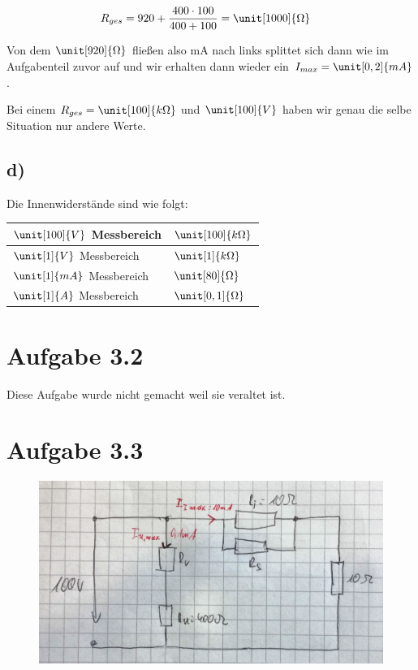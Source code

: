 \begin{align*}
R_{ges} &= 920 + \frac{400 \cdot 100}{400 + 100} = \unit[1000]{\Omega}
\end{align*}


Von dem $\unit[920]{\Omega}$ fließen also \unit[1]{mA} nach links splittet sich dann wie im Aufgabenteil zuvor auf und wir erhalten dann wieder ein $I_{max} = \unit[0,2]{mA}$.

Bei einem $R_{ges} = \unit[100]{k \Omega}$ und $\unit[100]{V}$ haben wir genau die selbe Situation nur andere Werte.


\subsection*{d)}

Die Innenwiderstände sind wie folgt:

\begin{tabular}{|l|l|}
	\hline $\unit[100]{V}$ Messbereich & $\unit[100]{k\Omega}$  \\ 
	\hline $\unit[1]{V}$ Messbereich & $\unit[1]{k\Omega}$ \\ 
	\hline $\unit[1]{mA}$ Messbereich & $\unit[80]{\Omega}$ \\ 
	\hline $\unit[1]{A}$ Messbereich & $\unit[0,1]{\Omega}$ \\ 
	\hline 
\end{tabular} 

\section{Aufgabe 3.2}

Diese Aufgabe wurde nicht gemacht weil sie veraltet ist.

\newpage


\section{Aufgabe 3.3}

\begin{figure}[h]
	\centering
	\includegraphics[scale=0.15]{A3_3_1.jpg}
\end{figure}




